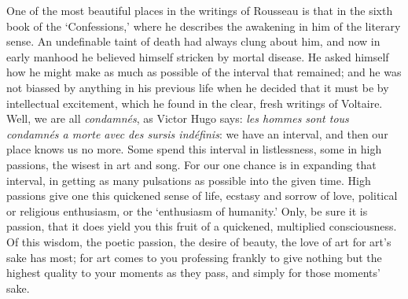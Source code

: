One of the most beautiful places in the writings of Rousseau is that in
the sixth book of the `Confessions,' where he describes the awakening in
him of the literary sense. An undefinable taint of death had always
clung about him, and now in early manhood he believed himself stricken
by mortal disease. He asked himself how he might make as much as
possible of the interval that remained; and he was not biassed by
anything in his previous life when he decided that it must be by
intellectual excitement, which he found in the clear, fresh writings of
Voltaire. Well, we are all \emph{condamnés}, as Victor Hugo says:
\emph{les hommes sont tous condamnés a morte avec des sursis indéfinis}:
we have an interval, and then our place knows us no more. Some spend
this interval in listlessness, some in high passions, the wisest in art
and song. For our one chance is in expanding that interval, in getting
as many pulsations as possible into the given time. High passions give
one this quickened sense of life, ecstasy and sorrow of love, political
or religious enthusiasm, or the `enthusiasm of humanity.' Only, be sure
it is passion, that it does yield you this fruit of a quickened,
multiplied consciousness. Of this wisdom, the poetic passion, the desire
of beauty, the love of art for art's sake has most; for art comes to you
professing frankly to give nothing but the highest quality to your
moments as they pass, and simply for those moments' sake.

